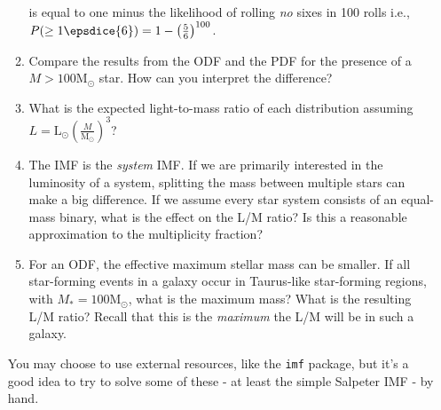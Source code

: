 \documentclass{article}
\newcommand{\msun}{\ensuremath{\mathrm{M}_\odot}\xspace}
\newcommand{\lsun}{\ensuremath{\mathrm{L}_\odot}\xspace}
\begin{document}
\begin{enumerate}
\begin{enumerate}
            is equal to one minus the likelihood of rolling \emph{no} sixes in 100 rolls
            i.e., $P(\ge 1 \epsdice{6}) = 1- \left(\frac{5}{6}\right)^{100}$.
        \item Compare the results from the ODF and the PDF for the presence of
            a $M>100\msun$ star.  How can you interpret the difference?
        \item What is the expected light-to-mass ratio of each distribution
            assuming $L = \lsun \left(\frac{M}{\msun}\right)^{3}$?
        \item The IMF is the \emph{system} IMF.  If we are primarily interested
            in the luminosity of a system, splitting the mass between multiple
            stars can make a big difference.  If we assume every star system
            consists of an equal-mass binary, what is the effect on the L/M ratio?
            Is this a reasonable approximation to the multiplicity fraction?
        \item For an ODF, the effective maximum stellar mass can be smaller.
            If all star-forming events in a galaxy occur in Taurus-like
            star-forming regions, with $M_*=100\msun$, what is the maximum
            mass?  What is the resulting L/M ratio?  Recall that this is
            the \emph{maximum} the L/M will be in such a galaxy.
    \end{enumerate}

    You may choose to use external resources, like the \texttt{imf} package,
    but it's a good idea to try to solve some of these - at least the simple
    Salpeter IMF - by hand.

\end{enumerate}
\end{document}
